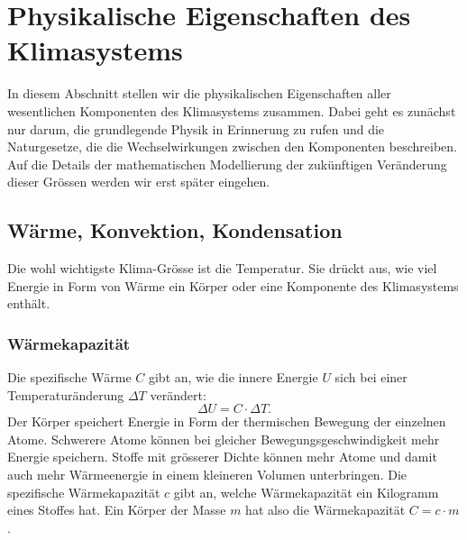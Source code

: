 %
%
%

\section{Physikalische Eigenschaften des Klimasystems\label{section:physik}}
In diesem Abschnitt stellen wir die physikalischen Eigenschaften
aller wesentlichen Komponenten des Klimasystems zusammen.
Dabei geht es zunächst nur darum, die grundlegende Physik in 
Erinnerung zu rufen und die Naturgesetze, die die Wechselwirkungen
zwischen den Komponenten beschreiben.
Auf die Details der mathematischen Modellierung der zukünftigen
Veränderung dieser Grössen werden wir erst später eingehen.

\subsection{Wärme, Konvektion, Kondensation}
Die wohl wichtigste Klima-Grösse ist die Temperatur.
Sie drückt aus, wie viel Energie in Form von Wärme ein Körper oder eine
Komponente des Klimasystems enthält.

\subsubsection{Wärmekapazität}
Die spezifische Wärme $C$ gibt an, wie die innere Energie $U$ sich bei
einer Temperaturänderung $\Delta T$ verändert:
\[
\Delta U = C\cdot\Delta T.
\]
Der Körper speichert Energie in Form der thermischen Bewegung der
einzelnen Atome.
Schwerere Atome können bei gleicher Bewegungsgeschwindigkeit 
mehr Energie speichern.
Stoffe mit grösserer Dichte können mehr Atome und damit auch mehr
Wärmeenergie in einem kleineren Volumen unterbringen.
Die spezifische Wärmekapazität $c$ gibt an, welche Wärmekapazität
ein Kilogramm eines Stoffes hat.
Ein Körper der Masse $m$ hat also die Wärmekapazität $C=c\cdot m$.


